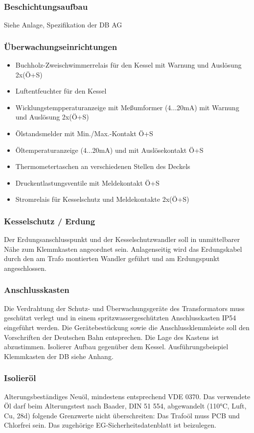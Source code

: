 \subsubsection*{Beschichtungsaufbau}
Siehe Anlage, Spezifikation der DB AG
\subsubsection*{Überwachungseinrichtungen}
\begin{itemize}[noitemsep]
    \item Buchholz-Zweischwimmerrelais für den Kessel mit Warnung und Auslösung 2x(Ö+S)
    \item Luftentfeuchter für den Kessel
    \item Wicklungstempperaturanzeige mit Meßumformer (4...20mA)  mit Warnung und Auslösung 2x(Ö+S)
    \item Ölstandsmelder mit Min./Max.-Kontakt Ö+S
    \item Öltemperaturanzeige  (4...20mA)  und mit Auslösekontakt Ö+S
    \item Thermometertaschen an verschiedenen Stellen des Deckels
    \item Druckentlastungsventile mit Meldekontakt Ö+S
    \item Stromrelais für Kesselschutz und Meldekontakte 2x(Ö+S)
\end{itemize}

\subsubsection*{Kesselschutz / Erdung}
Der Erdungsanschlusspunkt und der Kesselschutzwandler soll in unmittelbarer Nähe zum Klemmkasten angeordnet sein. Anlagenseitig wird das Erdungskabel durch den am Trafo montierten Wandler geführt und am Erdungspunkt angeschlossen. 

\subsubsection*{Anschlusskasten }
Die Verdrahtung der Schutz- und Überwachungsgeräte des Transformators muss geschützt verlegt und in einem spritzwassergeschützten Anschlusskasten IP54 eingeführt werden. Die Gerätebestückung sowie die Anschlussklemmleiste soll den Vorschriften der Deutschen Bahn entsprechen. Die Lage des Kastens ist abzustimmen. Isolierer Aufbau gegenüber dem Kessel.
Ausführungsbeispiel Klemmkasten der DB siehe Anhang.
\subsubsection*{Isolieröl}
Alterungsbeständiges Neuöl, mindestens entsprechend VDE 0370. Das verwendete Öl darf beim Alterungstest nach Baader, DIN 51 554, abgewandelt (110°C, Luft, Cu, 28d) folgende Grenzwerte nicht überschreiten:
Das Trafoöl muss PCB und Chlorfrei sein. Das zugehörige EG-Sicherheitsdatenblatt ist beizulegen.

